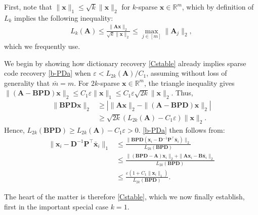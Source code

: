 \documentclass[9pt,twocolumn]{pnas-new}
\begin{document}
First, note that $\|\mathbf{x}\|_1 \leq \sqrt{k} \|\mathbf{x}\|_2$ for $k$-sparse $\mathbf{x} \in \mathbb{R}^m$, which by definition of $L_k$ implies the following inequality:
\begin{align}\label{delrho}
L_k(\mathbf{A}) \leq \frac{\|\mathbf{A}\mathbf{x}\|_2}{\sqrt{k} \|\mathbf{x}\|_2} %
\leq  \max_{j \in [m]}\|\mathbf{A}_j\|_2,
\end{align}
%
which we frequently use.

We begin by showing how dictionary recovery \eqref{Cstable} already implies sparse code recovery \eqref{b-PDa} when \mbox{$\varepsilon < L_{2k}(\mathbf{A}) / C_1$}, assuming without loss of generality that $\bar m = m$. For $2k$-sparse $\mathbf{x} \in \mathbb{R}^m$, the triangle inequality gives \mbox{$\|(\mathbf{A}-\mathbf{BPD})\mathbf{x}\|_2  \leq C_1\varepsilon \|\mathbf{x}\|_1 \leq C_1 \varepsilon \sqrt{2k}  \|\mathbf{x}\|_2$}. Thus, 
\begin{align*}
\|\mathbf{BPD}\mathbf{x}\|_2 
&\geq | \|\mathbf{A}\mathbf{x}\|_2 - \|(\mathbf{A}-\mathbf{BPD})\mathbf{x}\|_2 | \\
&\geq \sqrt{2k} (L_{2k}(\mathbf{A}) -  C_1\varepsilon) \|\mathbf{x}\|_2.
\end{align*}
%
Hence, $L_{2k}(\mathbf{BPD}) \geq L_{2k}(\mathbf{A}) - C_1\varepsilon  > 0$. \eqref{b-PDa} then follows from:
\begin{align*}
\|\mathbf{x}_i - \mathbf{D}^{-1}\mathbf{P}^{\top}\mathbf{\bar x}_i \|_1
&\leq \frac{\|\mathbf{BPD}(\mathbf{x}_i - \mathbf{D}^{-1}\mathbf{P}^{\top}\mathbf{\bar x}_i)\|_2}{L_{2k}(\mathbf{BPD})} \\
&\leq \frac{\|(\mathbf{BPD} - \mathbf{A})\mathbf{x}_i\|_2 + \|\mathbf{A}\mathbf{x}_i - \mathbf{B}\mathbf{\bar x}_i\|_2}{L_{2k}(\mathbf{BPD})} \\
&\leq \frac{\varepsilon (1 + C_1 \|\mathbf{x}_i\|_1)}{L_{2k}(\mathbf{BPD})}.
\end{align*}

The heart of the matter is therefore \eqref{Cstable}, which we now finally establish, first in the important special case $k = 1$.
\end{document}
